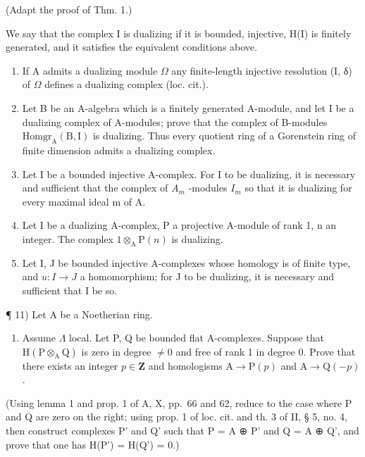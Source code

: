 (Adapt the proof of Thm. 1.)

We say that the complex I is dualizing if it is bounded, injective, H(I) is finitely generated, and it satisfies the equivalent conditions above.

\begin{enumerate}
\def\labelenumi{\alph{enumi})}
\setcounter{enumi}{1}
\item
  If A admits a dualizing module \(\Omega\) any finite-length injective resolution (I, δ) of \(\Omega\) defines a dualizing complex (loc. cit.).
\item
  Let B be an A-algebra which is a finitely generated A-module, and let I be a dualizing complex of A-modules; prove that the complex of B-modules \(\mathrm{Homgr}_{\mathrm{A}}(\mathrm{B},\mathrm{I})\) is dualizing. Thus every quotient ring of a Gorenstein ring of finite dimension admits a dualizing complex.
\item
  Let I be a bounded injective A-complex. For I to be dualizing, it is necessary and sufficient that the complex of \(A_{m}\) -modules \(I_{m}\) so that it is dualizing for every maximal ideal m of A.
\item
  Let I be a dualizing A-complex, P a projective A-module of rank 1, n an integer. The complex \(1 \otimes_{\mathrm{A}} \mathrm{P}(n)\) is dualizing.
\item
  Let I, J be bounded injective A-complexes whose homology is of finite type, and \(u: I \rightarrow J\) a homomorphism; for J to be dualizing, it is necessary and sufficient that I be so.
\end{enumerate}

¶ 11) Let A be a Noetherian ring.

\begin{enumerate}
\def\labelenumi{\alph{enumi})}
\tightlist
\item
  Assume \(\Lambda\) local. Let P, Q be bounded flat A-complexes. Suppose that \(\mathrm{H}(\mathrm{P}\otimes_{\mathrm{A}}\mathrm{Q})\) is zero in degree \(\neq 0\) and free of rank 1 in degree 0. Prove that there exists an integer \(p\in \mathbf{Z}\) and homologisms \(\mathrm{A}\to \mathrm{P}(p)\) and \(\mathrm{A}\to \mathrm{Q}(-p)\) .
\end{enumerate}

(Using lemma 1 and prop. 1 of A, X, pp.~66 and 62, reduce to the case where P and Q are zero on the right; using prop. 1 of loc. cit. and th. 3 of II, § 5, no. 4, then construct complexes P' and Q' such that P = A ⊕ P' and Q = A ⊕ Q', and prove that one has H(P') = H(Q') = 0.)

